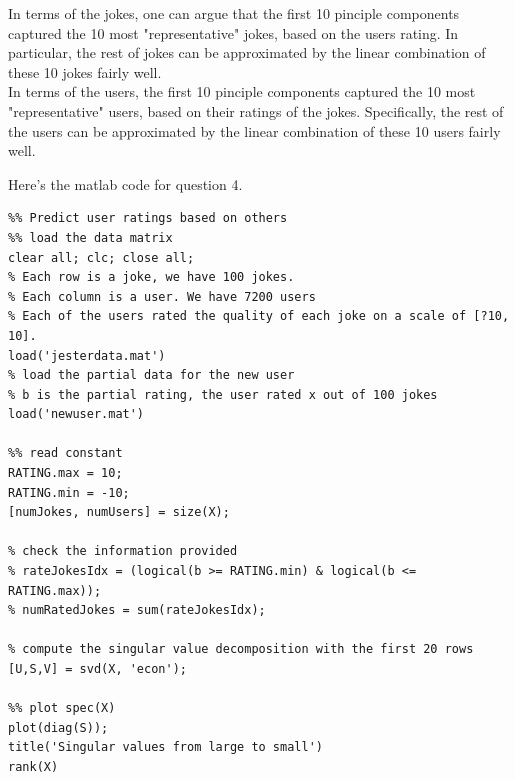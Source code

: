 \documentclass[paper=a4, fontsize=11pt]{scrartcl} %
\numberwithin{equation}{section} %
\numberwithin{figure}{section} %
\numberwithin{table}{section} %
\begin{document}
In terms of the jokes, one can argue that the first 10 pinciple components captured the 10 most "representative" jokes, based on the users rating. In particular, the rest of jokes can be approximated by the linear combination of these 10 jokes fairly well. \\

In terms of the users, the first 10 pinciple components captured the 10 most "representative" users, based on their ratings of the jokes. Specifically, the rest of the users can be approximated by the linear combination of these 10 users fairly well. 

\newpage
Here's the matlab code for question 4. 
\begin{lstlisting}
%% Predict user ratings based on others
%% load the data matrix
clear all; clc; close all; 
% Each row is a joke, we have 100 jokes.  
% Each column is a user. We have 7200 users 
% Each of the users rated the quality of each joke on a scale of [?10, 10].
load('jesterdata.mat')
% load the partial data for the new user 
% b is the partial rating, the user rated x out of 100 jokes
load('newuser.mat')

%% read constant 
RATING.max = 10;
RATING.min = -10;
[numJokes, numUsers] = size(X);

% check the information provided 
% rateJokesIdx = (logical(b >= RATING.min) & logical(b <= RATING.max)); 
% numRatedJokes = sum(rateJokesIdx);

% compute the singular value decomposition with the first 20 rows
[U,S,V] = svd(X, 'econ');

%% plot spec(X)
plot(diag(S));
title('Singular values from large to small')
rank(X)
\end{lstlisting}

\newpage
\end{document}
